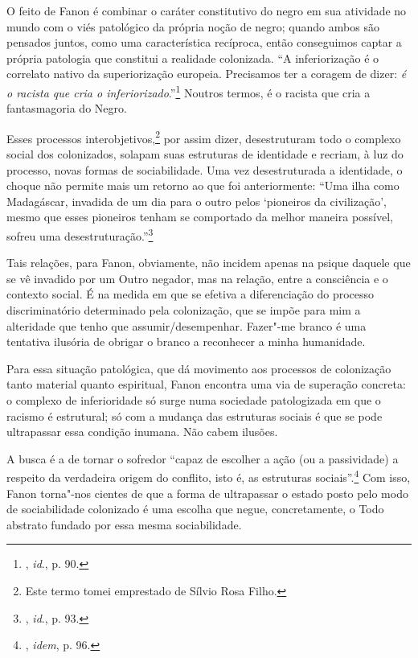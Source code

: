 O feito de Fanon é combinar o caráter constitutivo do negro em sua
atividade no mundo com o viés patológico da própria noção de negro;
quando ambos são pensados juntos, como uma característica recíproca,
então conseguimos captar a própria patologia que constitui a realidade
colonizada. ``A inferiorização é o correlato nativo da superiorização
europeia. Precisamos ter a coragem de dizer: \emph{é o racista que cria
o inferiorizado}.''\footnote{, \emph{id}., p. 90.} Noutros termos, é o
racista que cria a fantasmagoria do Negro.

Esses processos interobjetivos,\footnote{Este termo tomei emprestado de
  Sílvio Rosa Filho.} por assim dizer, desestruturam todo o complexo
social dos colonizados, solapam suas estruturas de identidade e recriam,
à luz do processo, novas formas de sociabilidade. Uma vez desestruturada
a identidade, o choque não permite mais um retorno ao que foi
anteriormente: ``Uma ilha como Madagáscar, invadida de um dia para o
outro pelos `pioneiros da civilização', mesmo que esses pioneiros tenham
se comportado da melhor maneira possível, sofreu uma
desestruturação.''\footnote{, \emph{id}., p. 93.}

Tais relações, para Fanon, obviamente, não incidem apenas na psique
daquele que se vê invadido por um Outro negador, mas na relação, entre a
consciência e o contexto social. É na medida em que se efetiva a
diferenciação do processo discriminatório determinado pela colonização,
que se impõe para mim a alteridade que tenho que assumir/desempenhar.
Fazer"-me branco é uma tentativa ilusória de obrigar o branco a
reconhecer a minha humanidade.

Para essa situação patológica, que dá movimento aos processos de
colonização tanto material quanto espiritual, Fanon encontra uma via de
superação concreta: o complexo de inferioridade só surge numa sociedade
patologizada em que o racismo é estrutural; só com a mudança das
estruturas sociais é que se pode ultrapassar essa condição inumana. Não
cabem ilusões.

A busca é a de tornar o sofredor ``capaz de escolher a ação (ou a
passividade) a respeito da verdadeira origem do conflito, isto é, as
estruturas sociais''.\footnote{, \emph{idem}, p. 96.} Com isso, Fanon
torna"-nos cientes de que a forma de ultrapassar o estado posto pelo modo
de sociabilidade colonizado é uma escolha que negue, concretamente, o
Todo abstrato fundado por essa mesma sociabilidade.

